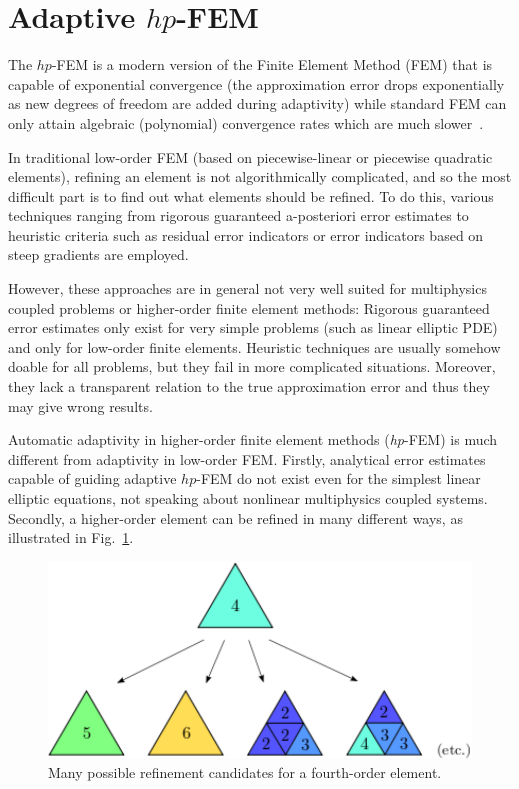 \section{Adaptive $hp$-FEM}
\label{sec:hermes}

The $hp$-FEM is a modern version of the Finite Element Method (FEM) that is 
capable of exponential convergence (the approximation error drops exponentially 
as new degrees of freedom are added during adaptivity) while standard FEM can 
only attain algebraic (polynomial) convergence rates which are much slower~\cite{Hermes-book}. 

In traditional low-order FEM (based on piecewise-linear or piecewise quadratic elements), 
refining an element is not algorithmically complicated,
and so the most difficult part is to find out what elements should be refined. 
To do this, various techniques ranging from rigorous guaranteed a-posteriori 
error estimates to heuristic criteria such as residual error indicators or
error indicators based on steep gradients are employed. 

However, these approaches are in general not very well suited for 
multiphysics coupled problems or higher-order finite element methods: 
Rigorous guaranteed error estimates only exist for very simple problems 
(such as linear elliptic PDE) and only for low-order finite elements.
Heuristic techniques are usually somehow doable for all problems, but 
they fail in more complicated situations. Moreover, they lack a 
transparent relation to the true approximation error and thus they may
give wrong results.

Automatic adaptivity in higher-order finite element methods (\emph{hp}-FEM) 
is much different from adaptivity in low-order FEM. Firstly, analytical
error estimates capable of guiding adaptive $hp$-FEM do not exist even for 
the simplest linear elliptic equations, not speaking about nonlinear multiphysics 
coupled systems. Secondly,
a higher-order element can be refined in many different ways, as illustrated 
in Fig.~\ref{fig:refinements}.
\begin{figure}[!ht]
  \begin{centering}
  \includegraphics[width=0.5\columnwidth]{refinements}
  \caption{\label{fig:refinements} Many possible refinement candidates for a fourth-order
  element.}
  \end{centering}
\end{figure}

